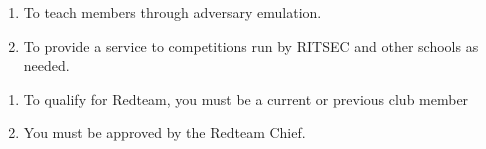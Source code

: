 

\begin{enumerate}
  \item To teach members through adversary emulation.
  \item To provide a service to competitions run by RITSEC and other schools as
    needed.
\end{enumerate}


\begin{enumerate}
  \item To qualify for Redteam, you must be a current or previous club member
  \item You must be approved by the Redteam Chief.
\end{enumerate}